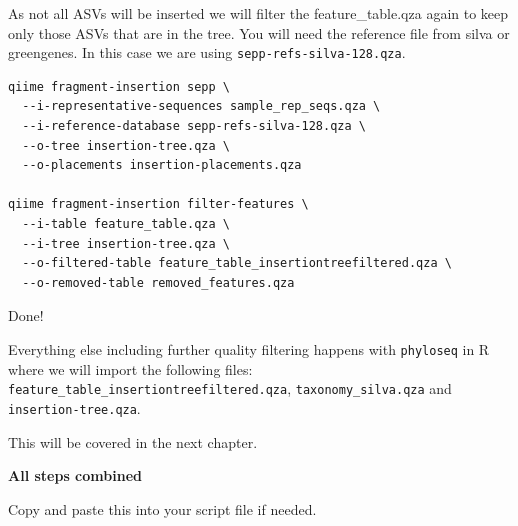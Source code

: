 \documentclass[
]{book}
\begin{document}
As not all ASVs will be inserted we will filter the feature\_table.qza again to keep only those ASVs that are in the tree. You will need the reference file from silva or greengenes. In this case we are using \texttt{sepp-refs-silva-128.qza}.

\begin{verbatim}
qiime fragment-insertion sepp \
  --i-representative-sequences sample_rep_seqs.qza \
  --i-reference-database sepp-refs-silva-128.qza \
  --o-tree insertion-tree.qza \
  --o-placements insertion-placements.qza

qiime fragment-insertion filter-features \
  --i-table feature_table.qza \
  --i-tree insertion-tree.qza \
  --o-filtered-table feature_table_insertiontreefiltered.qza \
  --o-removed-table removed_features.qza
\end{verbatim}

Done!

Everything else including further quality filtering happens with \texttt{phyloseq} in R where we will import the following files:
\texttt{feature\_table\_insertiontreefiltered.qza},
\texttt{taxonomy\_silva.qza} and
\texttt{insertion-tree.qza}.

This will be covered in the next chapter.

\textbf{All steps combined}

Copy and paste this into your script file if needed.
\end{document}
